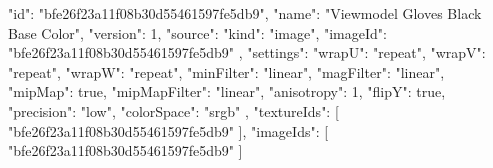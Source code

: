 {
  "id": "bfe26f23a11f08b30d55461597fe5db9",
  "name": "Viewmodel Gloves Black Base Color",
  "version": 1,
  "source": {
    "kind": "image",
    "imageId": "bfe26f23a11f08b30d55461597fe5db9"
  },
  "settings": {
    "wrapU": "repeat",
    "wrapV": "repeat",
    "wrapW": "repeat",
    "minFilter": "linear",
    "magFilter": "linear",
    "mipMap": true,
    "mipMapFilter": "linear",
    "anisotropy": 1,
    "flipY": true,
    "precision": "low",
    "colorSpace": "srgb"
  },
  "textureIds": [
    "bfe26f23a11f08b30d55461597fe5db9"
  ],
  "imageIds": [
    "bfe26f23a11f08b30d55461597fe5db9"
  ]
}
